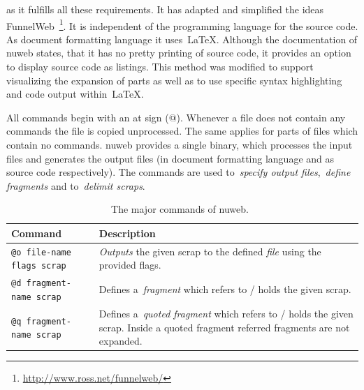 \documentclass[%
    a4paper,    %
    justified,  %
    nobib,      %
    openany     %
]{tufte-book}
\begin{document}
 as it fulfills all these requirements. It has adapted and simplified the
ideas FunnelWeb~\footnote{\url{http://www.ross.net/funnelweb/}}. It is
independent of the programming language for the source code. As document
formatting language it uses~\LaTeX{}. Although the documentation of nuweb
states, that it has no pretty printing of source code, it provides an option to
display source code as listings. This method was modified to support visualizing
the expansion of parts as well as to use specific syntax highlighting and code
output within~\LaTeX{}.

 All commands
begin with an at sign (@). Whenever a file does not contain any commands the
file is copied unprocessed. The same applies for parts of files which contain no
commands. nuweb provides a single binary, which processes the
input files and generates the output files (in document formatting language and
as source code respectively). The commands are used to~\emph{specify output
files},~\emph{define fragments }and to~\emph{delimit scraps}.

\begin{table}[h]
  \caption{The major commands of nuweb.~\cite[p. 3]{briggs-nuweb-93}}
  \label{table:nuweb-commands}
  \begin{tabularx}{\textwidth}{lX}
    \toprule
    \textbf{Command} & \textbf{Description}\\
    \midrule
    \verb|@o file-name flags scrap| & \emph{Outputs} the given scrap to the
                                       defined \emph{file} using the provided
                                       flags.\\
    \verb|@d fragment-name scrap|   & Defines a~\emph{fragment} which refers to
                                       / holds the given scrap.\\
    \verb|@q fragment-name scrap|   & Defines a~\emph{quoted fragment} which refers to
                                       / holds the given scrap. Inside a quoted
                                       fragment referred fragments are not expanded.\\
    \bottomrule
  \end{tabularx}
\end{table}
\end{document}
